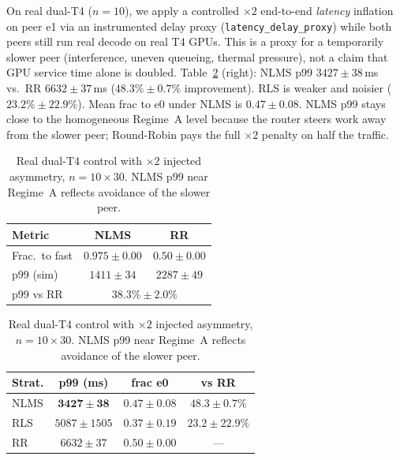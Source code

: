 \documentclass[pdflatex,sn-mathphys-num]{sn-jnl}
\begin{document}
On real dual-T4 ($n{=}10$), we apply a controlled $\times 2$ end-to-end
\emph{latency} inflation on peer e1 via an instrumented delay proxy
(\texttt{latency\_delay\_proxy}) while both peers still run real decode on real T4
GPUs. This is a proxy for a temporarily slower peer (interference, uneven queueing,
thermal pressure), not a claim that GPU service time alone is doubled.
Table~\ref{tab:realC} (right): NLMS p99 $3427\pm38$\,ms vs.\ RR $6632\pm37$\,ms
($48.3\%\pm0.7\%$ improvement). RLS is weaker and noisier ($23.2\%\pm22.9\%$). Mean
frac to e0 under NLMS is $0.47\pm0.08$. NLMS p99 stays close to the homogeneous
Regime~A level because the router steers work away from the slower peer; Round-Robin
pays the full $\times 2$ penalty on half the traffic. \begin{table}[ht]
\centering
\begin{minipage}[t]{0.48\textwidth}
\centering
\caption{Simulation control. Slope-skew dual workers, $n{=}10\times 200$.}
\label{tab:sim}
\footnotesize
\setlength{\tabcolsep}{3pt}
\begin{tabular}{@{}lcc@{}}
\toprule
Metric & NLMS & RR \\
\midrule
Frac.\ to fast & $0.975\pm0.00$ & $0.50\pm0.00$ \\
p99 (sim) & $1411\pm34$ & $2287\pm49$ \\
p99 vs RR & \multicolumn{2}{c}{$38.3\%\pm2.0\%$} \\
\bottomrule
\end{tabular}
\end{minipage}\hfill
\begin{minipage}[t]{0.50\textwidth}
\centering
\caption{Real dual-T4 control with $\times 2$ injected asymmetry,
$n{=}10\times 30$. NLMS p99 near Regime~A reflects avoidance of the slower peer.}
\label{tab:realC}
\footnotesize
\setlength{\tabcolsep}{2.5pt}
\begin{tabular}{@{}lccc@{}}
\toprule
Strat. & p99 (ms) & frac e0 & vs RR \\
\midrule
NLMS & $\mathbf{3427\pm38}$ & $0.47\pm0.08$ & $\mathbf{48.3\pm0.7\%}$ \\
RLS & $5087\pm1505$ & $0.37\pm0.19$ & $23.2\pm22.9\%$ \\
RR & $6632\pm37$ & $0.50\pm0.00$ & --- \\
\bottomrule
\end{tabular}
\end{minipage}
\end{table}
\end{document}
